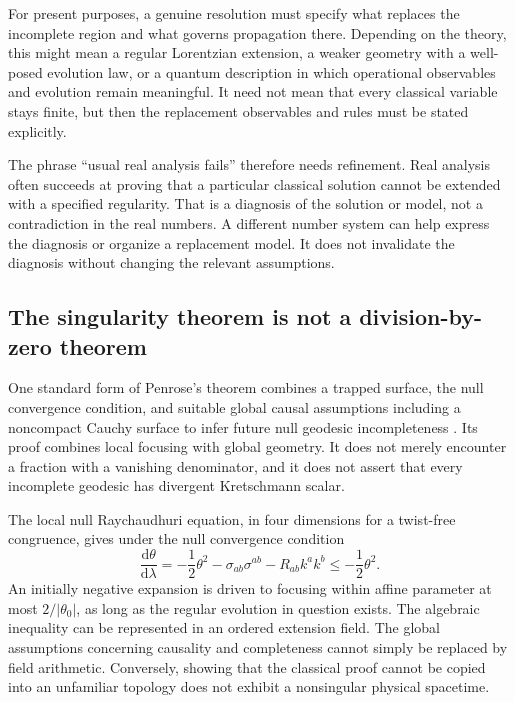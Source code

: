 \documentclass[11pt,letterpaper]{article}
\newcommand{\dd}{\mathrm{d}}
\theoremstyle{definition}
\theoremstyle{remark}
\begin{document}
For present purposes, a genuine resolution must specify what replaces the
incomplete region and what governs propagation there. Depending on the theory,
this might mean a regular Lorentzian extension, a weaker geometry with a
well-posed evolution law, or a quantum description in which operational
observables and evolution remain meaningful. It need not mean that every
classical variable stays finite, but then the replacement observables and
rules must be stated explicitly.

The phrase ``usual real analysis fails'' therefore needs refinement. Real
analysis often succeeds at proving that a particular classical solution cannot
be extended with a specified regularity. That is a diagnosis of the solution
or model, not a contradiction in the real numbers. A different number system
can help express the diagnosis or organize a replacement model. It does not
invalidate the diagnosis without changing the relevant assumptions.

\subsection{The singularity theorem is not a division-by-zero theorem}

One standard form of Penrose's theorem combines a trapped surface, the null
convergence condition, and suitable global causal assumptions including a
noncompact Cauchy surface to infer future null geodesic incompleteness
\cite{Penrose,Witten}. Its proof combines local focusing with global geometry.
It does not merely encounter a fraction with a vanishing denominator, and it
does not assert that every incomplete geodesic has divergent Kretschmann
scalar.

The local null Raychaudhuri equation, in four dimensions for a twist-free
congruence, gives under the null convergence condition
\begin{equation}
 \frac{\dd\theta}{\dd\lambda}
 =-\frac12\theta^2-\sigma_{ab}\sigma^{ab}
   -R_{ab}k^ak^b
 \leq-\frac12\theta^2.
 \label{eq:ray}
\end{equation}
An initially negative expansion is driven to focusing within affine parameter
at most $2/|\theta_0|$, as long as the regular evolution in question exists.
The algebraic inequality can be represented in an ordered extension field.
The global assumptions concerning causality and completeness cannot simply be
replaced by field arithmetic. Conversely, showing that the classical proof
cannot be copied into an unfamiliar topology does not exhibit a nonsingular
physical spacetime.
\end{document}
